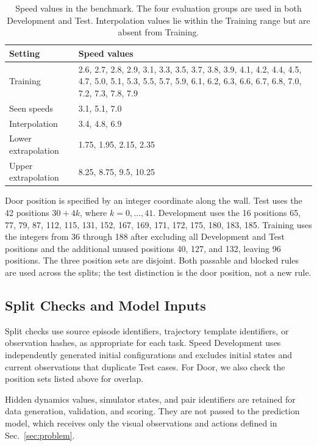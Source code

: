 \begin{table}[!ht]
\centering
\small
\caption{Speed values in the benchmark. The four evaluation groups are used in both Development and Test. Interpolation values lie within the Training range but are absent from Training.}
\label{tab:speed-values}
\begin{tabularx}{\linewidth}{@{}lX@{}}
\toprule
Setting & Speed values \\
\midrule
Training & 2.6, 2.7, 2.8, 2.9, 3.1, 3.3, 3.5, 3.7, 3.8, 3.9, 4.1, 4.2, 4.4, 4.5, 4.7, 5.0, 5.1, 5.3, 5.5, 5.7, 5.9, 6.1, 6.2, 6.3, 6.6, 6.7, 6.8, 7.0, 7.2, 7.3, 7.8, 7.9 \\
\midrule
Seen speeds & 3.1, 5.1, 7.0 \\
Interpolation & 3.4, 4.8, 6.9 \\
Lower extrapolation & 1.75, 1.95, 2.15, 2.35 \\
Upper extrapolation & 8.25, 8.75, 9.5, 10.25 \\
\bottomrule
\end{tabularx}
\end{table}

Door position is specified by an integer coordinate along the wall.
Test uses the 42 positions $30+4k$, where $k=0,\ldots,41$.
Development uses the 16 positions 65, 77, 79, 87, 112, 115, 131, 152, 167, 169, 171, 172, 175, 180, 183, 185.
Training uses the integers from 36 through 188 after excluding all Development and Test positions and the additional unused positions 40, 127, and 132, leaving 96 positions.
The three position sets are disjoint.
Both passable and blocked rules are used across the splits; the test distinction is the door position, not a new rule.

\subsection{Split Checks and Model Inputs}

Split checks use source episode identifiers, trajectory template identifiers, or observation hashes, as appropriate for each task.
Speed Development uses independently generated initial configurations and excludes initial states and current observations that duplicate Test cases.
For Door, we also check the position sets listed above for overlap.

Hidden dynamics values, simulator states, and pair identifiers are retained for data generation, validation, and scoring.
They are not passed to the prediction model, which receives only the visual observations and actions defined in Sec.~\ref{sec:problem}.


